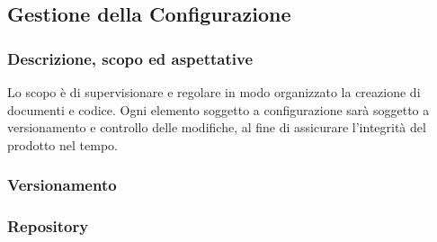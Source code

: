 \subsection{Gestione della Configurazione}

\subsubsection{Descrizione, scopo ed aspettative}
    Lo scopo è di supervisionare e regolare in modo organizzato la creazione di 
    documenti e codice. Ogni elemento soggetto a configurazione sarà soggetto a versionamento
    e controllo delle modifiche, al fine di assicurare l'integrità del prodotto 
    nel tempo.

\subsubsection{Versionamento}

\subsubsection{Repository}


